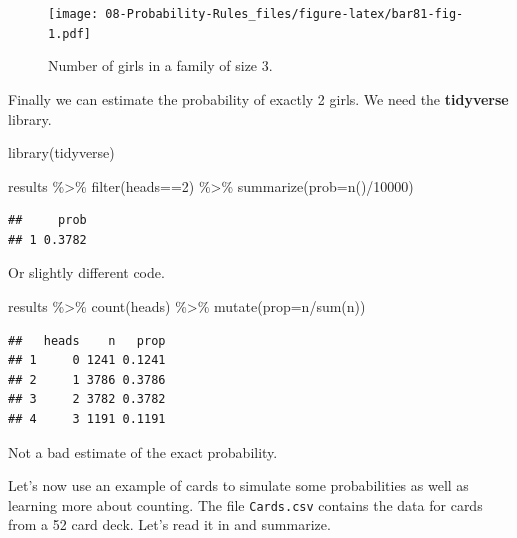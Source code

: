 \documentclass[
]{book}
\newenvironment{Shaded}{\begin{snugshade}}{\end{snugshade}}
\newcommand{\AttributeTok}[1]{\textcolor[rgb]{0.77,0.63,0.00}{#1}}
\newcommand{\DecValTok}[1]{\textcolor[rgb]{0.00,0.00,0.81}{#1}}
\newcommand{\FunctionTok}[1]{\textcolor[rgb]{0.00,0.00,0.00}{#1}}
\newcommand{\NormalTok}[1]{#1}
\newcommand{\SpecialCharTok}[1]{\textcolor[rgb]{0.00,0.00,0.00}{#1}}
\begin{document}
\begin{figure}
\centering
\texttt{[image: 08-Probability-Rules\_files/figure-latex/bar81-fig-1.pdf]}
\caption{\label{fig:bar81-fig}Number of girls in a family of size 3.}
\end{figure}

Finally we can estimate the probability of exactly 2 girls. We need the \textbf{tidyverse} library.

\begin{Shaded}
\begin{Highlighting}[]
\FunctionTok{library}\NormalTok{(tidyverse)}
\end{Highlighting}
\end{Shaded}

\begin{Shaded}
\begin{Highlighting}[]
\NormalTok{results }\SpecialCharTok{\%\textgreater{}\%}
  \FunctionTok{filter}\NormalTok{(heads}\SpecialCharTok{==}\DecValTok{2}\NormalTok{) }\SpecialCharTok{\%\textgreater{}\%}
  \FunctionTok{summarize}\NormalTok{(}\AttributeTok{prob=}\FunctionTok{n}\NormalTok{()}\SpecialCharTok{/}\DecValTok{10000}\NormalTok{)}
\end{Highlighting}
\end{Shaded}

\begin{verbatim}
##     prob
## 1 0.3782
\end{verbatim}

Or slightly different code.

\begin{Shaded}
\begin{Highlighting}[]
\NormalTok{results }\SpecialCharTok{\%\textgreater{}\%}
  \FunctionTok{count}\NormalTok{(heads) }\SpecialCharTok{\%\textgreater{}\%}
  \FunctionTok{mutate}\NormalTok{(}\AttributeTok{prop=}\NormalTok{n}\SpecialCharTok{/}\FunctionTok{sum}\NormalTok{(n))}
\end{Highlighting}
\end{Shaded}

\begin{verbatim}
##   heads    n   prop
## 1     0 1241 0.1241
## 2     1 3786 0.3786
## 3     2 3782 0.3782
## 4     3 1191 0.1191
\end{verbatim}

Not a bad estimate of the exact probability.

Let's now use an example of cards to simulate some probabilities as well as learning more about counting. The file \texttt{Cards.csv} contains the data for cards from a 52 card deck. Let's read it in and summarize.
\end{document}
